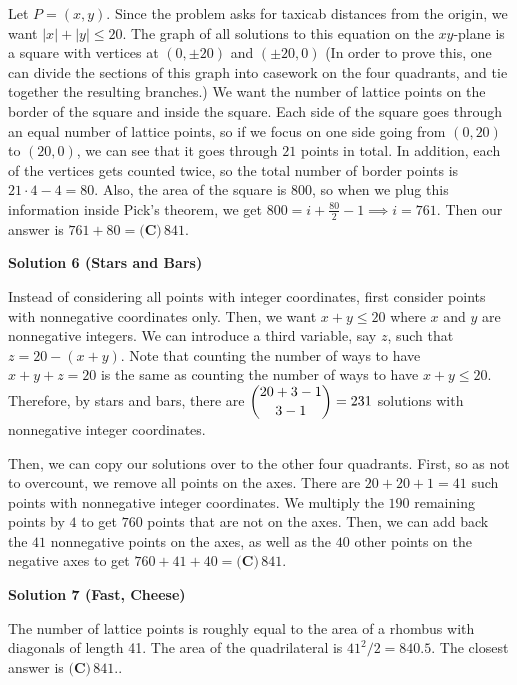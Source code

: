 \begin{enumerate}
Let $P = (x, y)$. Since the problem asks for taxicab distances from the origin, we want $|x| + |y| \le 20$. The graph of all solutions to this equation on the $xy$-plane is a square with vertices at $(0, \pm 20)$ and $(\pm 20, 0)$ (In order to prove this, one can divide the sections of this graph into casework on the four quadrants, and tie together the resulting branches.) We want the number of lattice points on the border of the square and inside the square. Each side of the square goes through an equal number of lattice points, so if we focus on one side going from $(0,20)$ to $(20, 0)$, we can see that it goes through $21$ points in total. In addition, each of the vertices gets counted twice, so the total number of border points is $21\cdot4 - 4 = 80$. Also, the area of the square is $800$, so when we plug this information inside Pick's theorem, we get $800 = i + \frac{80}{2} - 1 \implies i = 761$. Then our answer is $761+80 = \boxed{\textbf{(C)} \, 841}.$




\textbf{Solution 6 (Stars and Bars)}

Instead of considering all points with integer coordinates, first consider points with nonnegative coordinates only. Then, we want $x + y \le 20$ where $x$ and $y$ are nonnegative integers. We can introduce a third variable, say $z$, such that $z = 20 - (x + y)$. Note that counting the number of ways to have $x + y + z = 20$ is the same as counting the number of ways to have $x + y \le 20$. Therefore, by stars and bars, there are $\dbinom{20 + 3 - 1}{3 - 1} = 231$ solutions with nonnegative integer coordinates.

 Then, we can copy our solutions over to the other four quadrants. First, so as not to overcount, we remove all points on the axes. There are $20 + 20 + 1 = 41$ such points with nonnegative integer coordinates. We multiply the $190$ remaining points by $4$ to get $760$ points that are not on the axes. Then, we can add back the $41$ nonnegative points on the axes, as well as the $40$ other points on the negative axes to get $760 + 41 + 40 = \boxed{\textbf{(C)} \, 841}.$




\textbf{Solution 7 (Fast, Cheese)}

The number of lattice points is roughly equal to the area of a rhombus with diagonals of length 41. The area of the quadrilateral is $41^2/2 = 840.5$. The closest answer is $\boxed{\textbf{(C)} \, 841}.$.

 



\end{enumerate}
